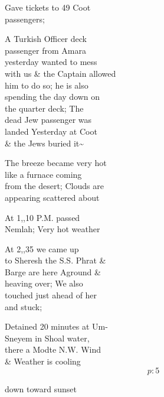 \documentclass{report}
\begin{document}
	\par{
 	Gave tickets to 49 Coot\ \\passengers;\ \\
	}

	\par{
 	A Turkish Officer deck\ \\passenger from Amara\ \\yesterday wanted to mess\ \\with us \& the Captain allowed\ \\him to do so; he is also\ \\spending the day down on\ \\the quarter deck; The\ \\dead Jew passenger was\ \\landed Yesterday at Coot\ \\\& the Jews buried it\~{}\ \\
	}

	\par{
 	The breeze became very hot\ \\like a furnace coming\ \\from the desert; Clouds are\ \\appearing scattered about\ \\
	}

	\par{
 	At 1,,10 P.M. passed\ \\Nemlah; Very hot weather\ \\
	}

	\par{
 	At 2,,35 we came up\ \\to Sheresh the S.S. Phrat \&\ \\Barge are here Aground \&\ \\heaving over; We also\ \\touched just ahead of her\ \\and stuck;\ \\
	}

	\par{
 	Detained 20 minutes at Um-\ \\Sneyem in Shoal water,\ \\there a Modte N.W. Wind\ \\\& Weather is cooling\ \\
  \[p: 5 \]

	}


	\par{
 	down toward sunset\ \\
	}
\end{document}
